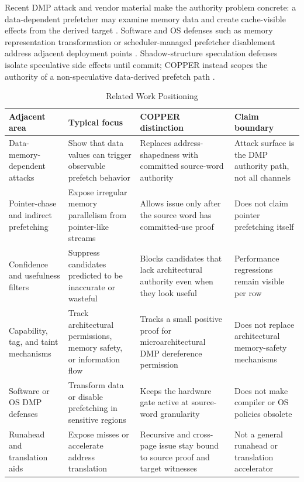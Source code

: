 \documentclass[10pt]{article}
\begin{document}
Recent DMP attack and vendor material make the authority problem concrete: a data-dependent prefetcher may examine memory data and create cache-visible effects from the derived target \cite{augury,gofetch,intelDDP}. Software and OS defenses such as memory representation transformation or scheduler-managed prefetcher disablement address adjacent deployment points \cite{splittingsecrets,prefence}. Shadow-structure speculation defenses isolate speculative side effects until commit; COPPER instead scopes the authority of a non-speculative data-derived prefetch path \cite{safespec}.

\begin{table}[H]
\centering
\caption{Related Work Positioning}
\label{tab:related-positioning}
\begin{tabularx}{\linewidth}{YYYY}
\hline
Adjacent area & Typical focus & COPPER distinction & Claim boundary \\
\hline
Data-memory-dependent attacks & Show that data values can trigger observable prefetch behavior & Replaces address-shapedness with committed source-word authority & Attack surface is the DMP authority path, not all channels \\
Pointer-chase and indirect prefetching & Expose irregular memory parallelism from pointer-like streams & Allows issue only after the source word has committed-use proof & Does not claim pointer prefetching itself \\
Confidence and usefulness filters & Suppress candidates predicted to be inaccurate or wasteful & Blocks candidates that lack architectural authority even when they look useful & Performance regressions remain visible per row \\
Capability, tag, and taint mechanisms & Track architectural permissions, memory safety, or information flow & Tracks a small positive proof for microarchitectural DMP dereference permission & Does not replace architectural memory-safety mechanisms \\
Software or OS DMP defenses & Transform data or disable prefetching in sensitive regions & Keeps the hardware gate active at source-word granularity & Does not make compiler or OS policies obsolete \\
Runahead and translation aids & Expose misses or accelerate address translation & Recursive and cross-page issue stay bound to source proof and target witnesses & Not a general runahead or translation accelerator \\
\hline
\end{tabularx}
\end{table}
\end{document}
